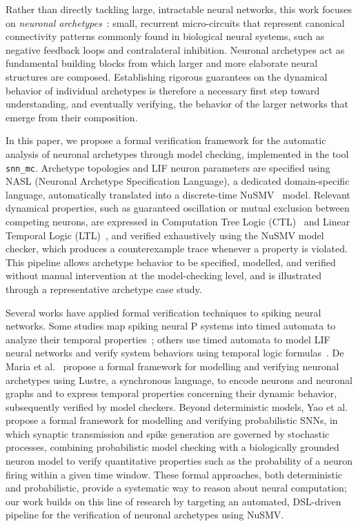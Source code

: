 \documentclass[
]{ceurart}
\begin{document}
Rather than directly tackling large, intractable neural networks, this work
focuses on \emph{neuronal archetypes}~\cite{DeMaria2020}: small, recurrent
micro-circuits that represent canonical connectivity patterns commonly found
in biological neural systems, such as negative feedback loops and
contralateral inhibition. Neuronal archetypes act as fundamental building
blocks from which larger and more elaborate neural structures are composed.
Establishing rigorous guarantees on the dynamical behavior of individual
archetypes is therefore a necessary first step toward understanding, and
eventually verifying, the behavior of the larger networks that emerge from
their composition.

In this paper, we propose a formal verification framework for the automatic
analysis of neuronal archetypes through model checking, implemented in the
tool \texttt{snn\_mc}. Archetype topologies and LIF neuron parameters are
specified using \textsc{NASL} (Neuronal Archetype Specification Language),
a dedicated domain-specific language, automatically translated into a
discrete-time NuSMV~\cite{Cimatti1999} model. Relevant dynamical
properties, such as guaranteed oscillation or mutual exclusion between
competing neurons, are expressed in Computation Tree Logic
(CTL)~\cite{Clarke1986} and Linear Temporal Logic (LTL)~\cite{Pnueli1977},
and verified exhaustively using the NuSMV model checker, which produces a
counterexample trace whenever a property is violated. This pipeline allows
archetype behavior to be specified, modelled, and verified without manual
intervention at the model-checking level, and is illustrated through a
representative archetype case study.

Several works have applied formal verification techniques to spiking neural
networks. Some studies map spiking neural P systems into timed automata to
analyze their temporal properties~\cite{Aman2016}; others use timed
automata to model LIF neural networks and verify system behaviors using
temporal logic formulas~\cite{DeMaria2018}. De Maria et
al.~\cite{DeMaria2020} propose a formal framework for modelling and verifying
neuronal archetypes using Lustre, a synchronous language, to encode neurons
and neuronal graphs and to express temporal properties concerning their
dynamic behavior, subsequently verified by model checkers. Beyond
deterministic models, Yao et al.~\cite{yao2023probabilistic} propose a formal framework
for modelling and verifying probabilistic SNNs, in which synaptic
transmission and spike generation are governed by stochastic processes,
combining probabilistic model checking with a biologically grounded neuron
model to verify quantitative properties such as the probability of a neuron
firing within a given time window. These formal approaches, both
deterministic and probabilistic, provide a systematic way to reason about
neural computation; our work builds on this line of research by targeting an
automated, DSL-driven pipeline for the verification of neuronal archetypes
using NuSMV.
\end{document}
